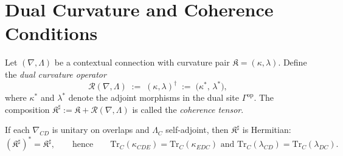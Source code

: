 
\section{Dual Curvature and Coherence Conditions}
\label{sec:vol2-part2-curvature}\relax\hspace{0pt}

\begin{definition}\label{def:dual-curvatures}
Let $(\nabla,\Lambda)$ be a contextual connection with curvature pair $\mathfrak K=(\kappa,\lambda)$. 
Define the \emph{dual curvature operator}
\[
\mathcal R(\nabla,\Lambda)\;:=\;(\kappa,\lambda)^{\dagger}\;:=\;\big(\kappa^*,\,\lambda^*\big),
\]
where $\kappa^*$ and $\lambda^*$ denote the adjoint morphisms in the dual site $\Gamma^{\mathrm{op}}$. 
The composition $\mathfrak K^{\sharp}:=\mathfrak K+\mathcal R(\nabla,\Lambda)$ is called the \emph{coherence tensor}.
\end{definition}

\begin{lemma}\label{lem:hermitian-symmetry}
If each $\nabla_{CD}$ is unitary on overlaps and $\Lambda_C$ self-adjoint, then $\mathfrak K^{\sharp}$ is Hermitian:
\[
(\mathfrak K^{\sharp})^*=\mathfrak K^{\sharp},
\qquad\text{hence}\qquad 
\mathrm{Tr}_C(\kappa_{CDE})=\mathrm{Tr}_C(\kappa_{EDC})\text{ and }\mathrm{Tr}_C(\lambda_{CD})=\mathrm{Tr}_C(\lambda_{DC}).
\]
\end{lemma}

